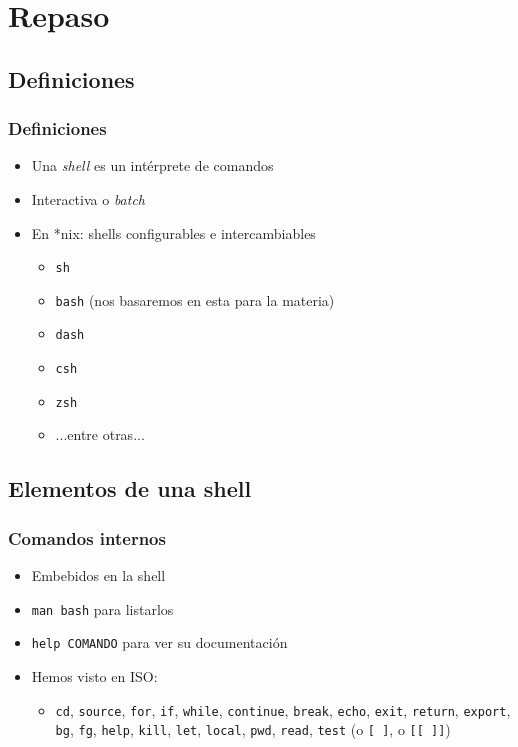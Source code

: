 \section{Repaso}
\subsection{Definiciones}
\begin{frame}
  \frametitle{Definiciones}
  \begin{itemize}
    \item Una \textit{shell} es un intérprete de comandos
    \item Interactiva o \textit{batch}
    \item En *nix: shells configurables e intercambiables
    \begin{itemize}
      \item \texttt{sh}
      \item \texttt{bash} (nos basaremos en esta para la materia)
      \item \texttt{dash}
      \item \texttt{csh}
      \item \texttt{zsh}
      \item ...entre otras...
    \end{itemize}
  \end{itemize}
\end{frame}

\subsection{Elementos de una shell}

\begin{frame}
  \frametitle{Comandos internos}
  \begin{itemize}
    \item Embebidos en la shell
    \item \texttt{man bash} para listarlos
    \item \texttt{help COMANDO} para ver su documentación
    \item Hemos visto en ISO:
    \begin{itemize}
      \item \texttt{cd}, \texttt{source}, \texttt{for}, \texttt{if}, \texttt{while},
        \texttt{continue}, \texttt{break}, \texttt{echo}, \texttt{exit}, \texttt{return}, \texttt{export},
        \texttt{bg}, \texttt{fg}, \texttt{help}, \texttt{kill}, \texttt{let}, \texttt{local},
        \texttt{pwd}, \texttt{read}, \texttt{test} (o \texttt{[ ]}, o \texttt{[[ ]]})
    \end{itemize}
  \end{itemize}
\end{frame}

